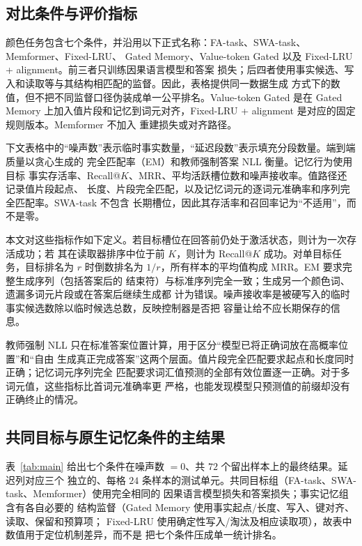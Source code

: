 \documentclass[letterpaper]{article}
\begin{document}
\subsection{对比条件与评价指标}

颜色任务包含七个条件，并沿用以下正式名称：FA-task、SWA-task、Memformer、Fixed-LRU、
Gated Memory、Value-token Gated 以及 Fixed-LRU + alignment。前三者只训练因果语言模型和答案
损失；后四者使用事实候选、写入和读取等与其结构相匹配的监督。因此，表格提供同一数据生成
方式下的数值，但不把不同监督口径伪装成单一公平排名。Value-token Gated 是在 Gated Memory
上加入值片段和记忆到词元对齐，Fixed-LRU + alignment 是对应的固定规则版本。Memformer 不加入
重建损失或对齐路径。

下文表格中的“噪声数”表示临时事实数量，“延迟段数”表示填充分段数量。端到端质量以贪心生成的
完全匹配率（EM）和教师强制答案 NLL 衡量。记忆行为使用目标
事实存活率、Recall@$K$、MRR、平均活跃槽位数和噪声接收率。值路径还记录值片段起点、
长度、片段完全匹配，以及记忆词元的逐词元准确率和序列完全匹配率。SWA-task 不包含
长期槽位，因此其存活率和召回率记为“不适用”，而不是零。

本文对这些指标作如下定义。若目标槽位在回答前仍处于激活状态，则计为一次存活成功；若
其在读取器排序中位于前 $K$，则计为 Recall@$K$ 成功。对单目标任务，目标排名为 $r$
时倒数排名为 $1/r$，所有样本的平均值构成 MRR。EM 要求完整生成序列（包括答案后的
结束符）与标准序列完全一致；生成另一个颜色词、遗漏多词元片段或在答案后继续生成都
计为错误。噪声接收率是被硬写入的临时事实候选数除以临时候选总数，反映控制器是否把
容量让给不应长期保存的信息。

教师强制 NLL 只在标准答案位置计算，用于区分“模型已将正确词放在高概率位置”和“自由
生成真正完成答案”这两个层面。值片段完全匹配要求起点和长度同时正确；记忆词元序列完全
匹配要求词汇值预测的全部有效位置逐一正确。对于多词元值，这些指标比首词元准确率更
严格，也能发现模型只预测值的前缀却没有正确终止的情况。

\subsection{共同目标与原生记忆条件的主结果}

表~\ref{tab:main} 给出七个条件在噪声数 $=0$、共 $72$ 个留出样本上的最终结果。延迟列对应三个
独立的、每格 $24$ 条样本的测试单元。共同目标组（FA-task、SWA-task、Memformer）使用完全相同的
因果语言模型损失和答案损失；事实记忆组含有各自必要的
结构监督（Gated Memory 使用事实起点/长度、写入、键对齐、读取、保留和预算项；
Fixed-LRU 使用确定性写入/淘汰及相应读取项），故表中数值用于定位机制差异，而不是
把七个条件压成单一统计排名。
\end{document}
